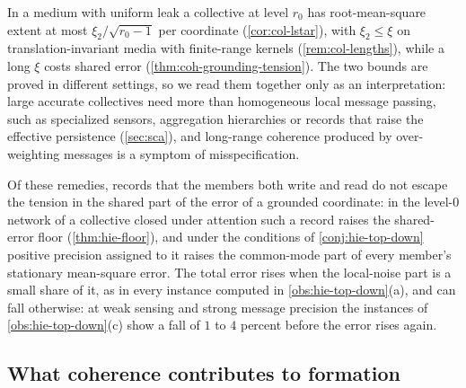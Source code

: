 \begin{remark}\label{rem:coh-h4}
In a medium with uniform leak a collective at level $r_0$ has root-mean-square extent at most $\xi_2/\sqrt{r_0-1}$ per coordinate (\cref{cor:col-lstar}), with $\xi_2\le\xi$ on translation-invariant media with finite-range kernels (\cref{rem:col-lengths}), while a long $\xi$ costs shared error (\cref{thm:coh-grounding-tension}). The two bounds are proved in different settings, so we read them together only as an interpretation: large accurate collectives need more than homogeneous local message passing, such as specialized sensors, aggregation hierarchies or records that raise the effective persistence (\cref{sec:sca}), and long-range coherence produced by over-weighting messages is a symptom of misspecification.
\end{remark}

Of these remedies, records that the members both write and read do not escape the tension in the shared part of the error of a grounded coordinate: in the level-0 network of a collective closed under attention such a record raises the shared-error floor (\cref{thm:hie-floor}), and under the conditions of \cref{conj:hie-top-down} positive precision assigned to it raises the common-mode part of every member's stationary mean-square error. The total error rises when the local-noise part is a small share of it, as in every instance computed in \cref{obs:hie-top-down}(a), and can fall otherwise: at weak sensing and strong message precision the instances of \cref{obs:hie-top-down}(c) show a fall of $1$ to $4$ percent before the error rises again.

\subsection{What coherence contributes to formation}\label{sec:coh-formation}

